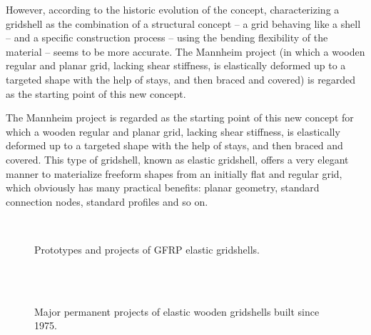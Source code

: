 However, according to the historic evolution of the concept, characterizing a gridshell as the combination of a structural concept -- a grid behaving like a shell -- and a specific construction process -- using the bending flexibility of the material -- seems to be more accurate. The Mannheim project (in which a wooden regular and planar grid, lacking shear stiffness, is elastically deformed up to a targeted shape with the help of stays, and then braced and covered) is regarded as the starting point of this new concept.

The Mannheim project is regarded as the starting point of this new concept for which a wooden regular and planar grid, lacking shear stiffness, is elastically deformed up to a targeted shape with the help of stays, and then braced and covered.
This type of gridshell, known as elastic gridshell, offers a very elegant manner to materialize freeform shapes from an initially flat and regular grid, which obviously has many practical benefits: planar geometry, standard connection nodes, standard profiles and so on.


\begin{figure}[h]
		\captionsetup[subfloat]{captionskip=10pt}
		\\
		\hspace*{\fill}
		\vspace{10pt}
		\caption{Prototypes and projects of GFRP elastic gridshells.}
		\label{fig:proto}    
\end{figure}

\begin{figure}[p]
	\begin{fullpage}
		\captionsetup[subfloat]{captionskip=10pt}
     		\centering
		\hspace*{\fill}
		 \\
		\hspace*{\fill}
		 \\
		\hspace*{\fill}
		\vspace{20pt}
		\caption{Major permanent projects of elastic wooden gridshells built since 1975.}
		\label{fig:projects}    
	\end{fullpage}
\end{figure}


